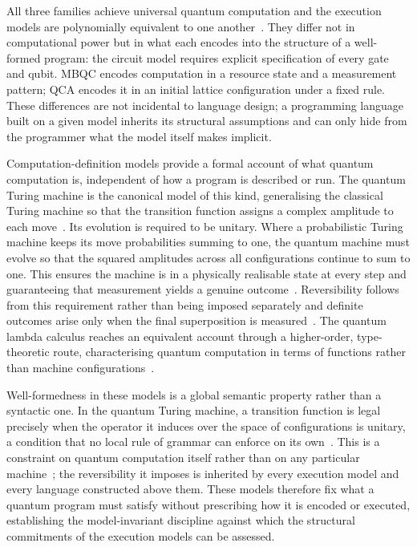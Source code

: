 All three families achieve universal quantum computation and the execution models are polynomially equivalent to one another~\cite{aharonov2007adiabatic,childs2009quantumwalk,farrelly2020qca}.
They differ not in computational power but in what each encodes into the structure of a well-formed program: the circuit model requires explicit specification of every gate and qubit.
MBQC encodes computation in a resource state and a measurement pattern; QCA encodes it in an initial lattice configuration under a fixed rule.
These differences are not incidental to language design; a programming language built on a given model inherits its structural assumptions and can only hide from the programmer what the model itself makes implicit.

Computation-definition models provide a formal account of what quantum computation is, independent of how a program is described or run.
The quantum Turing machine is the canonical model of this kind, generalising the classical Turing machine so that the transition function assigns a complex amplitude to each move~\cite{bernstein1997quantum}.
Its evolution is required to be unitary.
Where a probabilistic Turing machine keeps its move probabilities summing to one, the quantum machine must evolve so that the squared amplitudes across all configurations continue to sum to one.
This ensures the machine is in a physically realisable state at every step and guaranteeing that measurement yields a genuine outcome~\cite{bernstein1997quantum}.
Reversibility follows from this requirement rather than being imposed separately and definite outcomes arise only when the final superposition is measured~\cite{bernstein1997quantum}.
The quantum lambda calculus reaches an equivalent account through a higher-order, type-theoretic route, characterising quantum computation in terms of functions rather than machine configurations~\cite{nunez_corrales2025betterabstractmachines}.

Well-formedness in these models is a global semantic property rather than a syntactic one.
In the quantum Turing machine, a transition function is legal precisely when the operator it induces over the space of configurations is unitary, a condition that no local rule of grammar can enforce on its own~\cite{bernstein1997quantum}.
This is a constraint on quantum computation itself rather than on any particular machine~\cite{bernstein1997quantum}; the reversibility it imposes is inherited by every execution model and every language constructed above them.
These models therefore fix what a quantum program must satisfy without prescribing how it is encoded or executed, establishing the model-invariant discipline against which the structural commitments of the execution models can be assessed.

